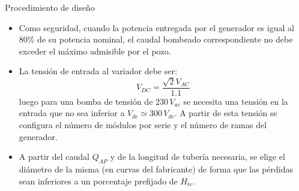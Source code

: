 \documentclass[xcolor={usenames,svgnames,dvipsnames}]{beamer}
\begin{document}
\begin{frame}[label=sec-3-3]{Procedimiento de diseño}
\begin{itemize}
\item Como seguridad, cuando la potencia entregada por el generador es
igual al 80\% de su potencia nominal, el caudal bombeado
correspondiente no debe exceder el máximo admisible por el pozo.

\item La tensión de entrada al variador debe
ser:$$V_{DC}=\frac{\sqrt{2}V_{AC}}{1.1}$$ luego para una bomba de
tensión de $230\, V_{ac}$ se necesita una tensión en la entrada que
no sea inferior a $V_{dc}\simeq300\, V_{dc}$. A partir de esta
tensión se configura el número de módulos por serie y el número de
ramas del generador.

\item A partir del caudal $Q_{AP}$ y de la longitud de tubería necesaria,
se elige el diámetro de la misma (en curvas del fabricante) de forma
que las pérdidas sean inferiores a un porcentaje prefijado de
$H_{te}$.
\end{itemize}
\end{frame}
\end{document}
